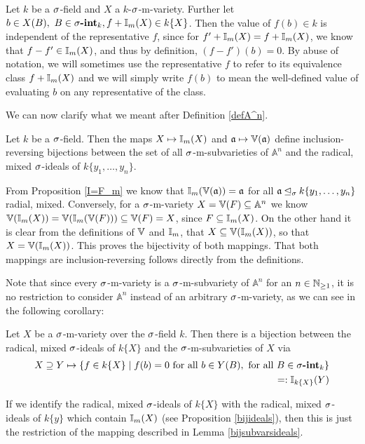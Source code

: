 \begin{rem}
Let $k$ be a $\sigma$-field and $X$ a $k$-$\sigma$-m-variety. Further let $b \in X(B), ~ B \in \sigma\text{{\normalfont\textbf{-int}}}_k, f + \mathbb{I}_m(X) \in k\{X\}$. Then the value of $f(b) \in k$ is independent of the representative $f$,
since for $f' + \mathbb{I}_m(X) = f + \mathbb{I}_m(X)$, we know that $f - f' \in \mathbb{I}_m(X)$, and thus by definition, $(f - f')(b) = 0$. By abuse of notation,
we will sometimes use the representative $f$ to refer to its equivalence class $f + \mathbb{I}_m(X)$ and we will simply write $f(b)$ to mean the well-defined value of evaluating $b$ on any representative of the class.
\end{rem}

We can now clarify what we meant after Definition \ref{defA^n}.

 \begin{lem}\label{bijsubvarsideals}
Let $k$ be a $\sigma$-field. Then the maps $X \mapsto \mathbb{I}_m(X)$ and $\mathfrak{a} \mapsto \mathbb{V}(\mathfrak{a})$ define inclusion-reversing bijections between the set of all $\sigma$-m-subvarieties of $\mathbb{A}^n$ and the radical, mixed $\sigma$-ideals of $k\{y_1,\ldots,y_n\}$.
\begin{bew}
From Proposition \ref{I=F_m} we know that $\mathbb{I}_m(\mathbb{V}(\mathfrak{a})) = \mathfrak{a}$ for all $\mathfrak{a} \unlhd_{\sigma} k\{y_1,\ldots,y_n\}$ radial, mixed. Conversely, for a $\sigma$-m-variety $X = \mathbb{V}(F) \subseteq \mathbb{A}^n$ we know  $\mathbb{V}(\mathbb{I}_m(X)) = \mathbb{V}(\mathbb{I}_m(\mathbb{V}(F))) \subseteq \mathbb{V}(F) = X$,
 since $F \subseteq \mathbb{I}_m(X)$. On the other hand it is clear from the definitions of $\mathbb{V}$ and $ \mathbb{I}_m$, that $X \subseteq \mathbb{V}(\mathbb{I}_m(X))$, so that $X = \mathbb{V}(\mathbb{I}_m(X))$. This proves the bijectivity of both mappings. That both mappings are inclusion-reversing follows directly from the definitions.
\end{bew}
\end{lem}

Note that since every $\sigma$-m-variety is a $\sigma$-m-subvariety of $\mathbb{A}^n$ for an $n \in \mathbb{N}_{\geq1}$, it is no restriction to consider $\mathbb{A}^n$ instead of an arbitrary $\sigma$-m-variety, as we can see in the following corollary:
\begin{cor}
  Let $X$ be a $\sigma$-m-variety over the $\sigma$-field $k$. Then there is a bijection between the radical, mixed $\sigma$-ideals of $k\{X\}$ and the $\sigma$-m-subvarieties of $X$ via
 \begin{align*} X \supseteq Y \mapsto \{f \in k\{X\} \mid f(b) = 0 \text{ for all } b \in Y(B), \text{ for all } B \in \sigma\text{{\normalfont\textbf{-int}}}_k \} \\ =: \mathbb{I}_{k\{X\}}(Y) \end{align*}
\begin{bew}
If we identify the radical, mixed $\sigma$-ideals of $k\{X\}$ with the radical, mixed $\sigma$-ideals of $k\{y\}$ which contain $\mathbb{I}_m(X)$ (see Proposition \ref{bijideals}), then this is just the restriction of the mapping described in Lemma \ref{bijsubvarsideals}.
\end{bew}
\end{cor}

